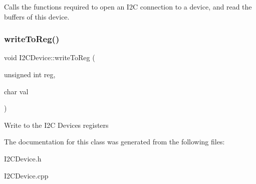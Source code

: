 Calls the functions required to open an I2C connection to a device, and read the buffers of this device.\mbox{\label{classI2CDevice_a390fcd7a411fbc92509a69c1d04660a2}} 
\subsubsection{\texorpdfstring{write\+To\+Reg()}{writeToReg()}}
{\footnotesize\ttfamily void I2\+C\+Device\+::write\+To\+Reg (\begin{DoxyParamCaption}\item[{unsigned int}]{reg,  }\item[{char}]{val }\end{DoxyParamCaption})\hspace{0.3cm}{\ttfamily [protected]}}

Write to the I2C Devices registers

The documentation for this class was generated from the following files\+:\begin{DoxyCompactItemize}
\item 
I2\+C\+Device.\+h\item 
I2\+C\+Device.\+cpp\end{DoxyCompactItemize}
